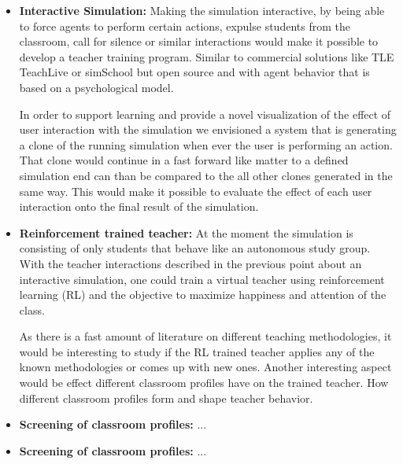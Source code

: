 \begin{itemize}
    \item \textbf{Interactive Simulation:} Making the simulation interactive, by being able to
    force agents to perform certain actions, expulse students from the classroom, call for silence
    or similar interactions would make it possible to develop a teacher training 
    program. Similar to commercial solutions like TLE TeachLive \cite{Dieker2017} or simSchool \cite{Badiee2015}
    but open source and with agent behavior that is based on a psychological model.
    
    \bb
    
    In order to support learning and provide a novel visualization of the effect
    of user interaction with the simulation we envisioned a system that is generating
    a clone of the running simulation when ever the user is performing an action.
    That clone would continue in a fast forward like matter to a defined simulation
    end can than be compared to the all other clones generated in the same way.
    This would make it possible to evaluate the effect of each user interaction
    onto the final result of the simulation.

    \item \textbf{Reinforcement trained teacher:} At the moment the simulation
    is consisting of only students that behave like an autonomous study group.
    With the teacher interactions described in the previous point about an interactive
    simulation, one could train a virtual teacher using reinforcement learning (RL) and
    the objective to maximize happiness and attention of the class.
    
    \bb

    As there is a fast amount of literature on different teaching methodologies,
    it would be interesting to study if the RL trained teacher applies any of the known
    methodologies or comes up with new ones. Another interesting aspect would be
    effect different classroom profiles have on the trained teacher. How different
    classroom profiles form and shape teacher behavior.

    \item \textbf{Screening of classroom profiles:} ...
    \item \textbf{Screening of classroom profiles:} ...
\end{itemize}